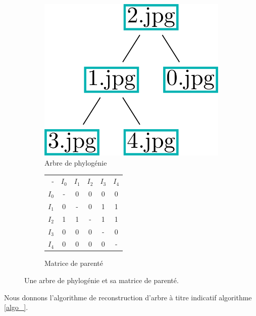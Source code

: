 \documentclass[utf8,final]{stageM2R} %
\begin{document}
\begin{figure}
  \begin{subfigure}{.5\textwidth}
    \centering
    \includegraphics[width=.5\linewidth]{images/algo_tree.png}
    \caption{Arbre de phylogénie}
    \label{algo_tree}
  \end{subfigure}%
  \begin{subfigure}{.5\textwidth}
    \centering
    \begin{tabular}{|r||c|c|c|c|c|}
      \hline
      - & $I_{0}$ & $I_{1}$ & $I_{2}$ & $I_{3}$ & $I_{4}$ \\ \hhline{|=::=|=|=|=|=|}
      $I_{0}$ & - & 0 & 0 & 0 & 0 \\ \hline
      $I_{1}$ & 0 & - & 0 & 1 & 1 \\ \hline
      $I_{2}$ & 1 & 1 & - & 1 & 1 \\ \hline
      $I_{3}$ & 0 & 0 & 0 & - & 0 \\ \hline
      $I_{4}$ & 0 & 0 & 0 & 0 & - \\ \hline
    \end{tabular} 
    \caption{Matrice de parenté}
    \label{parentage_matrix}
  \end{subfigure}
  \caption{Une arbre de phylogénie et sa matrice de parenté.}
  \label{parentage_tree}
\end{figure}

Nous donnons l'algorithme de reconstruction d'arbre à titre indicatif algorithme \ref{algo_}.
\end{document}
